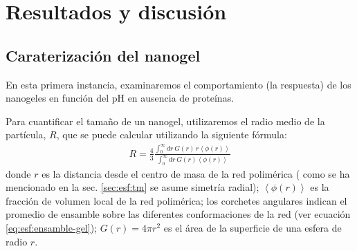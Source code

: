 \section{Resultados y discusi\'on}






\subsection{Caraterizaci\'on del nanogel}

En esta primera instancia, examinaremos el comportamiento (la respuesta) de los nanogeles en funci\'on del pH en ausencia de prote\'inas.

Para cuantificar el tama\~no de un nanogel, utilizaremos el radio medio de la part\'icula, $R$, que se puede calcular utilizando la siguiente fórmula:
\begin{align}
	R = \frac{4}{3}\frac{\int_0^\infty{dr\,G(r)\,r \left<\phi(r)\right>}}{\int_0^\infty{dr\,G(r)\left<\phi(r)\right>}}
\end{align}
\noindent donde $r$ es la distancia desde el centro de masa de la red polim\'erica ( como se ha mencionado en la sec. \ref{sec:esf:tm} se asume simetr\'ia radial);
$\left<\phi(r)\right>$ es la fracción de volumen local de la red polim\'erica;
los corchetes angulares indican el promedio de ensamble sobre las diferentes conformaciones de la red (ver ecuación \ref{eq:esf:ensamble-gel});
$G(r)=4\pi r^2$ es el \'area de la superficie de una esfera de radio $r$.

